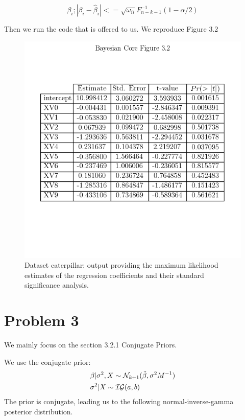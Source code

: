 \documentclass{article}
\begin{document}
\begin{equation}
    {\beta_{i};|\beta_{i}-\hat{\beta}_{i}|<=\sqrt{\omega_{ii}}F^{-1}_{n-k-1}(1-\alpha/2)}
\end{equation}

Then we run the code that is offered to us. We reproduce Figure 3.2
\begin{figure}[h!]
\centering
\includegraphics[scale=0.6]{Figure3_2.png}
\caption{Dataset caterpillar: output providing the maximum likelihood estimates of the regression coefficients and their standard significance analysis.}
\end{figure}


\section{Problem 3}
We mainly focus on the section 3.2.1 Conjugate Priors.

We use the conjugate prior:
\begin{equation}
\begin{aligned}
    &\beta|\sigma^{2}, X \sim \mathcal{N}_{k+1}(\Tilde{\beta},\sigma^{2}M^{-1})  \\
    &\sigma^{2} | X \sim \mathcal{IG}(a,b)
\end{aligned}
\end{equation}
The prior is conjugate, leading us to the following normal-inverse-gamma posterior distribution.
\end{document}
